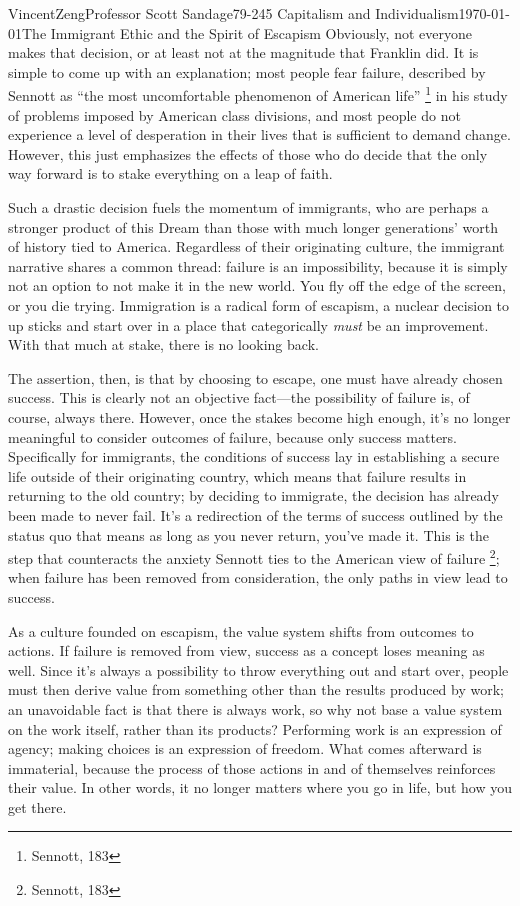 \documentclass[12pt]{article}
\begin{document}
\begin{mla}{Vincent}{Zeng}{Professor Scott Sandage}{79-245 Capitalism and Individualism}{\today}{The Immigrant Ethic and the Spirit of Escapism}
Obviously, not everyone makes that decision, or at least not at the magnitude
that Franklin did. It is simple to come up with an explanation; most people
fear failure, described by Sennott as ``the most uncomfortable phenomenon of
American life'' \footnote{Sennott, 183} in his study of problems imposed by
American class divisions, and most people do not experience 
a level of desperation in their lives that is sufficient to demand change.
However, this just emphasizes the effects of those who do decide that the only
way forward is to stake everything on a leap of faith. 

Such a drastic decision fuels the momentum of immigrants, who are perhaps a
stronger product of this Dream than those with much longer generations' worth
of history tied to America. Regardless of their originating culture, the
immigrant narrative shares a common thread: failure is an impossibility,
because it is simply not an option to not make it in the new world. You fly off
the edge of the screen, or you die trying. Immigration
is a radical form of escapism, a nuclear decision to up sticks and start over
in a place that categorically \textit{must} be an improvement. With that much at 
stake, there is no looking back.

The assertion, then, is that by choosing to escape, one must have already
chosen success. This is clearly not an objective fact---the possibility of
failure is, of course, always there. However, once the stakes become high
enough, it's no longer meaningful to consider outcomes of failure, because
only success matters. Specifically for immigrants, the conditions of success
lay in establishing a secure life outside of their originating country, which
means that failure results in returning to the old country; by deciding to immigrate,
the decision has already been made to never fail. It's a
redirection of the terms of success outlined by the status quo that means as
long as you never return, you've made it. This is the step that counteracts
the anxiety Sennott ties to the American view of failure \footnote{Sennott, 183}; when
failure has been removed from consideration, the only paths in view lead to
success.

As a culture founded on escapism, the value system shifts from outcomes to
actions. If failure is removed from view, success as a concept loses meaning
as well.  Since it's always a possibility to throw everything out and start
over, people must then derive value from something other than the results
produced by work; an unavoidable fact is that there is always work, so why not
base a value system on the work itself, rather than its products? Performing
work is an expression of agency; making choices is an expression of freedom.
What comes afterward is immaterial, because the process of those actions in
and of themselves reinforces their value. In other words, it no longer matters
where you go in life, but how you get there.


\end{mla}
\end{document}
